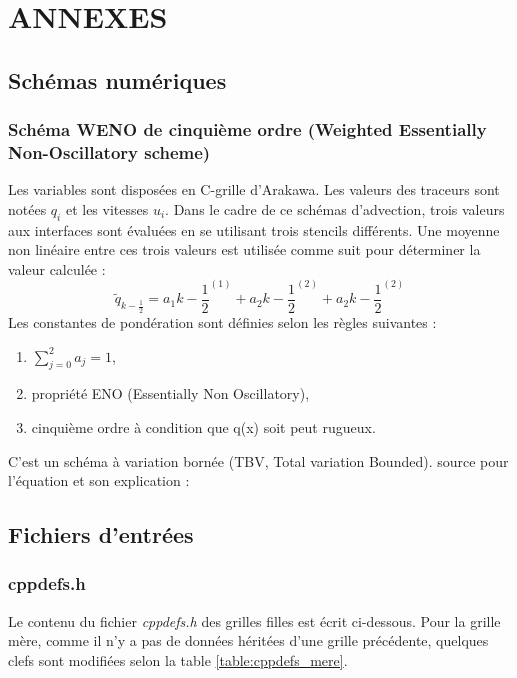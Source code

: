 \documentclass[10pt,a4paper,titlepage]{article}
\begin{document}
\newpage
\section{ANNEXES}
\label{annexes}
\subsection{Schémas numériques}
\subsubsection{Schéma WENO de cinquième ordre (Weighted Essentially Non-Oscillatory scheme)}\label{anx:WENO}
Les variables sont disposées en C-grille d'Arakawa.
Les valeurs des traceurs sont notées $q_i$ et les vitesses $u_i$.
Dans le cadre de ce schémas d'advection, trois valeurs aux interfaces sont évaluées en se utilisant trois stencils différents. Une moyenne non linéaire entre ces trois valeurs est utilisée comme suit pour déterminer la valeur calculée :
$$\tilde{q}_{k-\frac{1}{2}} = a_1k-\frac{1}{2}^{(1)} + a_2k-\frac{1}{2}^{(2)} + a_2k-\frac{1}{2}^{(2)}$$
Les constantes de pondération sont définies selon les règles suivantes :
\begin{enumerate}
    \item $\sum_{j=0}^{2}a_j = 1$,
    \item propriété ENO (Essentially Non Oscillatory),
    \item cinquième ordre à condition que q(x) soit peut rugueux.
\end{enumerate}
C'est un schéma à variation bornée (TBV, Total variation Bounded).
source pour l'équation et son explication : \cite{schemas_advection}


\subsection{Fichiers d'entrées}
\subsubsection{cppdefs.h}
\label{anx:cppdefs}
Le contenu du fichier \textit{cppdefs.h} des grilles filles est écrit ci-dessous. Pour la grille mère, comme il n'y a pas de données héritées d'une grille précédente, quelques clefs sont modifiées selon la table \ref{table:cppdefs_mere}.
\end{document}
